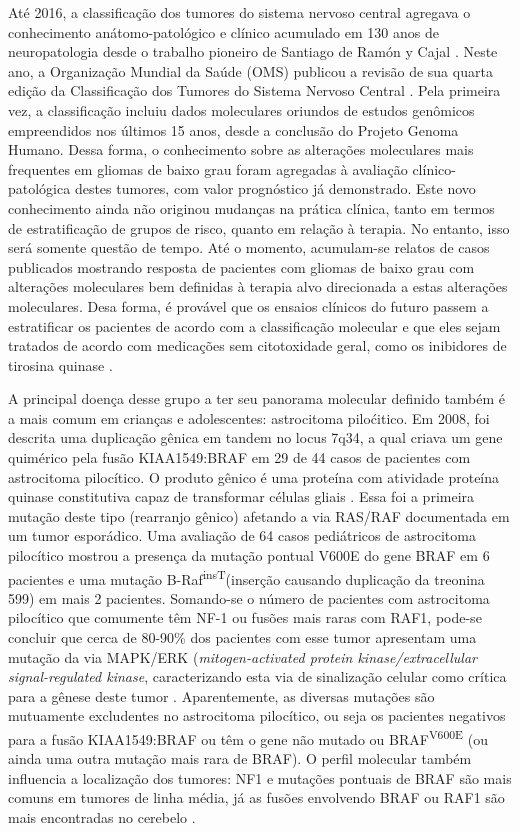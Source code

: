 \documentclass[11pt,a4paper,oldfontcommands]{memoir}
\begin{document}
Até 2016, a classificação dos tumores do sistema nervoso central agregava o conhecimento anátomo-patológico e clínico acumulado em 130 anos de neuropatologia desde o trabalho pioneiro de Santiago de Ramón y Cajal \cite{pinero2014santiago}. Neste ano, a Organização Mundial da Saúde (OMS) publicou a revisão de sua quarta edição da Classificação dos Tumores do Sistema Nervoso Central \cite{Louis2016}. Pela primeira vez, a classificação incluiu dados moleculares oriundos de estudos genômicos empreendidos nos últimos 15 anos, desde a conclusão do Projeto Genoma Humano. Dessa forma, o conhecimento sobre as alterações moleculares mais frequentes em gliomas de baixo grau foram agregadas à avaliação clínico-patológica destes tumores, com valor prognóstico já demonstrado. Este novo conhecimento ainda não originou mudanças na prática clínica, tanto em termos de estratificação de grupos de risco, quanto em relação à terapia. No entanto, isso será somente questão de tempo. Até o momento, acumulam-se relatos de casos publicados mostrando resposta de pacientes com gliomas de baixo grau com alterações moleculares bem definidas à terapia alvo direcionada a estas alterações moleculares. Desa forma, é provável que os ensaios clínicos do futuro passem a estratificar os pacientes de acordo com a classificação molecular e que eles sejam tratados de acordo com medicações sem citotoxidade geral, como os inibidores de tirosina quinase \cite{now209}.

A principal doença desse grupo a ter seu panorama molecular definido também é a mais comum em crianças e adolescentes: astrocitoma piloćitico. Em 2008, foi descrita uma duplicação gênica em tandem no locus 7q34, a qual criava um gene quimérico pela fusão KIAA1549:BRAF em 29 de 44 casos de pacientes com astrocitoma pilocítico. O produto gênico é uma proteína com atividade proteína quinase constitutiva capaz de transformar células gliais \cite{Jones8673}. Essa foi a primeira mutação deste tipo (rearranjo gênico) afetando a via RAS/RAF documentada em um tumor esporádico. Uma avaliação de 64 casos pediátricos de astrocitoma pilocítico mostrou a presença da mutação pontual V600E do gene BRAF em 6 pacientes e uma mutação B-Raf\textsuperscript{insT}(inserção causando duplicação da treonina 599) em mais 2 pacientes\cite{IJC25893}. Somando-se o número de pacientes com astrocitoma pilocítico que comumente têm NF-1 ou fusões mais raras com RAF1, pode-se concluir que cerca de 80-90\% dos pacientes com esse tumor apresentam uma mutação da via MAPK/ERK (\textit{mitogen-activated protein kinase/extracellular signal-regulated kinase}, caracterizando esta via de sinalização celular como crítica para a gênese deste tumor \cite{Jones2012}. Aparentemente, as diversas mutações são mutuamente excludentes no astrocitoma pilocítico, ou seja os pacientes negativos para a fusão KIAA1549:BRAF ou têm o gene não mutado ou BRAF\textsuperscript{V600E} (ou ainda uma outra mutação mais rara de BRAF). O perfil molecular também influencia a localização dos tumores: NF1 e mutações pontuais de BRAF são mais comuns em tumores de linha média, já as fusões envolvendo BRAF ou RAF1 são mais encontradas no cerebelo \cite{Jones2012}. 
\end{document}
